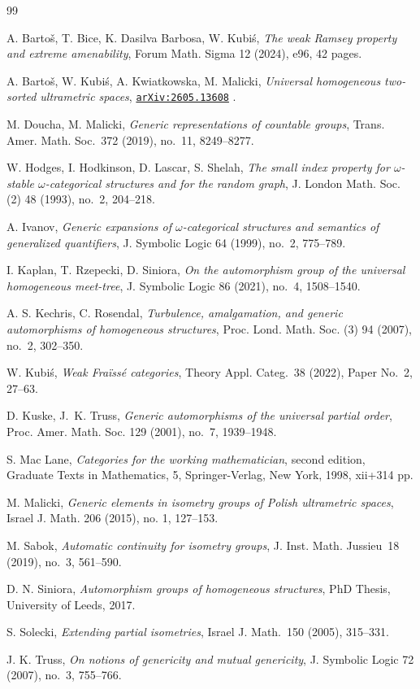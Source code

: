 \documentclass[oneside,notitlepage,12pt]{article}
\theoremstyle{definition}
\theoremstyle{remark}
\newcommand \arxivlink [1]{%
    \href{https://arxiv.org/abs/#1}{\texttt{arXiv:#1}}%
}
\begin{document}
\begin{thebibliography}{99}

{\sc A. Bartoš, T. Bice, K. Dasilva Barbosa, W. Kubiś},
{\it The weak Ramsey property and extreme amenability},
Forum Math. Sigma 12 (2024), e96, 42 pages.

{\sc A. Bartoš,  W. Kubiś, A. Kwiatkowska, M. Malicki},
{\it Universal homogeneous two-sorted ultrametric spaces},
\arxivlink{2605.13608}.

{\sc M. Doucha, M. Malicki},
{\it Generic representations of countable groups},
Trans. Amer. Math. Soc.~372 (2019), no.~11, 8249–8277.

{\sc W. Hodges, I. Hodkinson, D. Lascar, S. Shelah},
{\it The small index property for $\omega$-stable $\omega$-categorical structures and for the random graph},
J. London Math. Soc. (2) 48 (1993), no.~2, 204--218.

{\sc A. Ivanov},
{\it Generic expansions of $\omega$-categorical structures and semantics of generalized
quantifiers},
J. Symbolic Logic 64 (1999), no.~2, 775--789.

{\sc I. Kaplan, T. Rzepecki, D. Siniora},
{\it On the automorphism group of the universal homogeneous meet-tree},
J. Symbolic Logic 86 (2021), no.~4, 1508--1540.

{\sc A. S. Kechris, C. Rosendal}, 
{\it Turbulence, amalgamation, and generic automorphisms of homogeneous structures}, 
Proc. Lond. Math. Soc. (3) 94 (2007), no.~2, 302--350.

{\sc W. Kubiś},
{\it Weak Fraïssé categories},
Theory Appl. Categ.~38 (2022), Paper No.~2, 27--63.

{\sc D. Kuske, J.~K. Truss},
{\it Generic automorphisms of the universal partial order},
Proc. Amer. Math. Soc. 129 (2001), no.~7, 1939--1948.

{\sc S. Mac Lane},
{\it Categories for the working mathematician},
second edition, Graduate Texts in Mathematics, 5, Springer-Verlag, New York, 1998, xii+314 pp.

{\sc M. Malicki},
{\it Generic elements in isometry groups of Polish ultrametric spaces},
Israel J. Math. 206 (2015), no. 1, 127--153.

{\sc M. Sabok},
{\it Automatic continuity for isometry groups},
J. Inst. Math. Jussieu~18 (2019), no.~3, 561–590.

{\sc D. N. Siniora},
{\it Automorphism groups of homogeneous structures},
PhD Thesis, University of Leeds, 2017.

{\sc S. Solecki},
{\it Extending partial isometries},
Israel J. Math.~150 (2005), 315--331.

{\sc J. K. Truss},
{\it On notions of genericity and mutual genericity},
J. Symbolic Logic 72 (2007), no.~3, 755--766.

\end{thebibliography}

\end{document}
